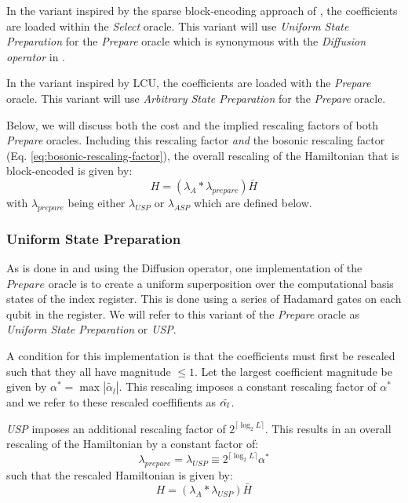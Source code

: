 In the variant inspired by the sparse block-encoding approach of \cite{camps2024explicit, liu2024efficient}, the coefficients are loaded within the \textit{Select} oracle.
This variant will use \textit{Uniform State Preparation} for the \textit{Prepare} oracle which is synonymous with the \textit{Diffusion operator} in \cite{camps2024explicit, liu2024efficient}.

In the variant inspired by LCU, the coefficients are loaded with the \textit{Prepare} oracle.
This variant will use \textit{Arbitrary State Preparation} for the \textit{Prepare} oracle.

Below, we will discuss both the cost and the implied rescaling factors of both \textit{Prepare} oracles.
Including this rescaling factor \textit{and} the bosonic rescaling factor (Eq. \ref{eq:bosonic-rescaling-factor}), the overall rescaling of the Hamiltonian that is block-encoded is given by:
\begin{equation}
    \label{eq:post-process}
    H = (\lambda_A * \lambda_{prepare}) \bar{H}
\end{equation}
with $\lambda_{prepare}$ being either $\lambda_{USP}$ or $\lambda_{ASP}$ which are defined below.


\subsubsection{Uniform State Preparation}
\label{subsubsec:usp}

As is done in \cite{camps2024explicit} and \cite{liu2024efficient} using the Diffusion operator, one implementation of the $\textit{Prepare}$ oracle is to create a uniform superposition over the computational basis states of the index register.
This is done using a series of Hadamard gates on each qubit in the register.
We will refer to this variant of the \textit{Prepare} oracle as \textit{Uniform State Preparation} or \textit{USP}.

A condition for this implementation is that the coefficients must first be rescaled such that they all have magnitude $\leq 1$.
Let the largest coefficient magnitude be given by $\alpha^* = \max{|\tilde{\alpha_l}|}$.
This rescaling imposes a constant rescaling factor of $\alpha^*$ and we refer to these rescaled coeffifients as $\Tilde{\alpha_l}$.

\textit{USP} imposes an additional rescaling factor of $2^{\lceil \log_2{L} \rceil}$.
This results in an overall rescaling of the Hamiltonian by a constant factor of:
\begin{equation}
    \label{eq:usp-rescaling}
    \lambda_{prepare} = \lambda_{USP} \equiv 2^{\lceil \log_2{L} \rceil} \alpha^*
\end{equation}
such that the rescaled Hamiltonian is given by:
\begin{equation}
    \label{Hbar scale}
    H = (\lambda_A * \lambda_{USP}) \bar{H}
\end{equation}

